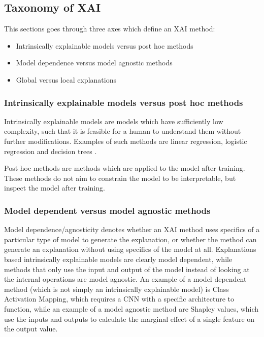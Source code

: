 \documentclass[conference]{IEEEtran}
\begin{document}
\subsection{Taxonomy of XAI}

This sections goes through three axes which define an XAI method:

\begin{itemize}
  \item Intrinsically explainable models versus post hoc methods
  \item Model dependence versus model agnostic methods
  \item Global versus local explanations
\end{itemize}


\subsubsection{Intrinsically explainable models versus post hoc methods}

Intrinsically explainable models are models which have sufficiently low complexity, such that it is feasible for a human to understand them without further modifications. Examples of such methods are linear regression, logistic regression and decision trees \cite{molnar}. 

Post hoc methods are methods which are applied to the model after training. These methods do not aim to constrain the model to be interpretable, but inspect the model after training.

\subsubsection{Model dependent versus model agnostic methods}

Model dependence/agnosticity denotes whether an XAI method uses specifics of a particular type of model to generate the explanation, or whether the method can generate an explanation without using specifics of the model at all. Explanations based intrinsically explainable models are clearly model dependent, while methods that only use the input and output of the model instead of looking at the internal operations are model agnostic. An example of a model dependent method (which is not simply an intrinsically explainable model) is Class Activation Mapping, which requires a CNN with a specific architecture to function, while an example of a model agnostic method are Shapley values, which use the inputs and outputs to calculate the marginal effect of a single feature on the output value.
\end{document}
